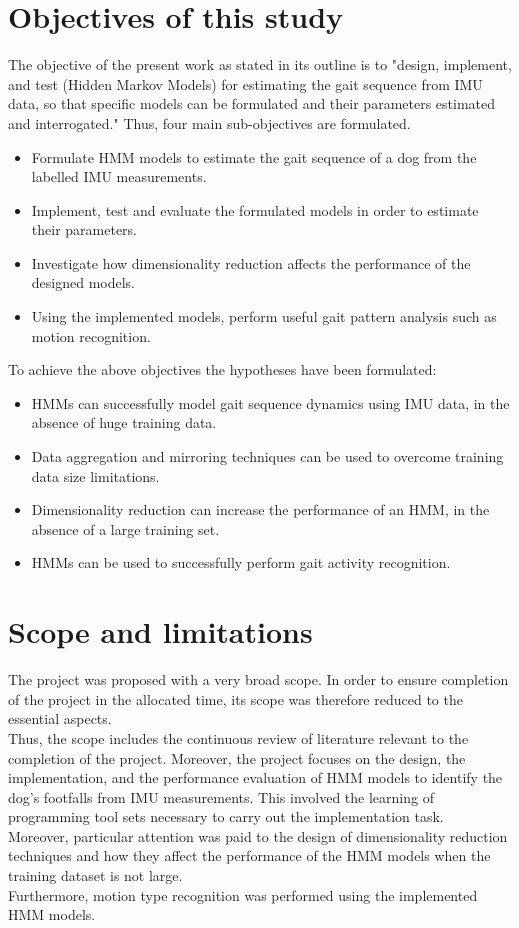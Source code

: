 \section{Objectives of this study}
The objective of the present work as stated in its outline is to "design, implement, and test (Hidden Markov Models) for estimating the gait sequence
from IMU data, so that specific models can be formulated and their
parameters estimated and interrogated." Thus, four main sub-objectives are formulated.
\begin{itemize}
	\item Formulate HMM models to estimate the gait sequence of a dog from the labelled IMU measurements.
	\item Implement, test and evaluate the formulated models in order to estimate their parameters.
	\item Investigate how dimensionality reduction affects the performance of the designed models.
	\item Using the implemented models, perform useful gait pattern analysis such as motion recognition.
\end{itemize}

To achieve the above objectives the hypotheses have been formulated:
\begin{itemize}
	\item HMMs can successfully model gait sequence dynamics using IMU data, in the absence of huge training data.
	\item Data aggregation and mirroring techniques can be used to overcome training data size limitations.
	\item Dimensionality reduction can increase the performance of an HMM, in the absence of a large training set.
	\item HMMs can be used to successfully perform gait activity recognition.
\end{itemize}


\section{Scope and limitations}
The project was proposed with a very broad scope. In order to ensure completion of the project in the allocated time, its scope was therefore reduced to the essential aspects.\\
Thus, the scope includes the continuous review of literature relevant to the completion of the project.
Moreover, the project focuses on the design, the implementation, and the performance evaluation of HMM models to identify the dog's footfalls from IMU measurements. This involved the learning of programming tool sets necessary to carry out the implementation task.\\
Moreover, particular attention was paid to the design of dimensionality reduction techniques and how they affect the performance of the HMM models when the training dataset is not large.\\
Furthermore, motion type recognition was performed using the implemented HMM models.
 
